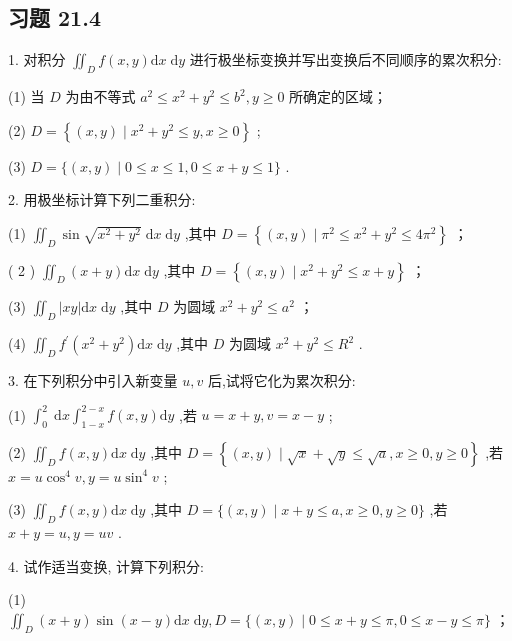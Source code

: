 \subsection{习题 21.4}

1. 对积分 \({\iint }_{D}f\left( {x,y}\right) \mathrm{d}x\mathrm{\;d}y\) 进行极坐标变换并写出变换后不同顺序的累次积分:

(1) 当 \(D\) 为由不等式 \({a}^{2} \leq  {x}^{2} + {y}^{2} \leq  {b}^{2},y \geq  0\) 所确定的区域；

(2) \(D = \left\{  {\left( {x,y}\right)  \mid  {x}^{2} + {y}^{2} \leq  y,x \geq  0}\right\}\) ;

(3) \(D = \{ \left( {x,y}\right)  \mid  0 \leq  x \leq  1,0 \leq  x + y \leq  1\}\) .

2. 用极坐标计算下列二重积分:

(1) \({\iint }_{D}\sin \sqrt{{x}^{2} + {y}^{2}}\mathrm{\;d}x\mathrm{\;d}y\) ,其中 \(D = \left\{  {\left( {x,y}\right)  \mid  {\pi }^{2} \leq  {x}^{2} + {y}^{2} \leq  4{\pi }^{2}}\right\}\) ；

( 2 ) \({\iint }_{D}\left( {x + y}\right) \mathrm{d}x\mathrm{\;d}y\) ,其中 \(D = \left\{  {\left( {x,y}\right)  \mid  {x}^{2} + {y}^{2} \leq  x + y}\right\}\) ；

(3) \({\iint }_{D}\left| {xy}\right| \mathrm{d}x\mathrm{\;d}y\) ,其中 \(D\) 为圆域 \({x}^{2} + {y}^{2} \leq  {a}^{2}\) ；

(4) \({\iint }_{D}{f}^{\prime }\left( {{x}^{2} + {y}^{2}}\right) \mathrm{d}x\mathrm{\;d}y\) ,其中 \(D\) 为圆域 \({x}^{2} + {y}^{2} \leq  {R}^{2}\) .

3. 在下列积分中引入新变量 \(u,v\) 后,试将它化为累次积分:

(1) \({\int }_{0}^{2}\mathrm{\;d}x{\int }_{1 - x}^{2 - x}f\left( {x,y}\right) \mathrm{d}y\) ,若 \(u = x + y,v = x - y\) ;

(2) \({\iint }_{D}f\left( {x,y}\right) \mathrm{d}x\mathrm{\;d}y\) ,其中 \(D = \left\{  {\left( {x,y}\right)  \mid  \sqrt{x} + \sqrt{y} \leq  \sqrt{a},x \geq  0,y \geq  0}\right\}\) ,若 \(x = u{\cos }^{4}v,y = u{\sin }^{4}v\) ;

(3) \({\iint }_{D}f\left( {x,y}\right) \mathrm{d}x\mathrm{\;d}y\) ,其中 \(D = \{ \left( {x,y}\right)  \mid  x + y \leq  a,x \geq  0,y \geq  0\}\) ,若 \(x + y = u,y = {uv}\) .

4. 试作适当变换, 计算下列积分:

(1) \({\iint }_{D}\left( {x + y}\right) \sin \left( {x - y}\right) \mathrm{d}x\mathrm{\;d}y,D = \{ \left( {x,y}\right)  \mid  0 \leq  x + y \leq  \pi ,0 \leq  x - y \leq  \pi \}\) ；


